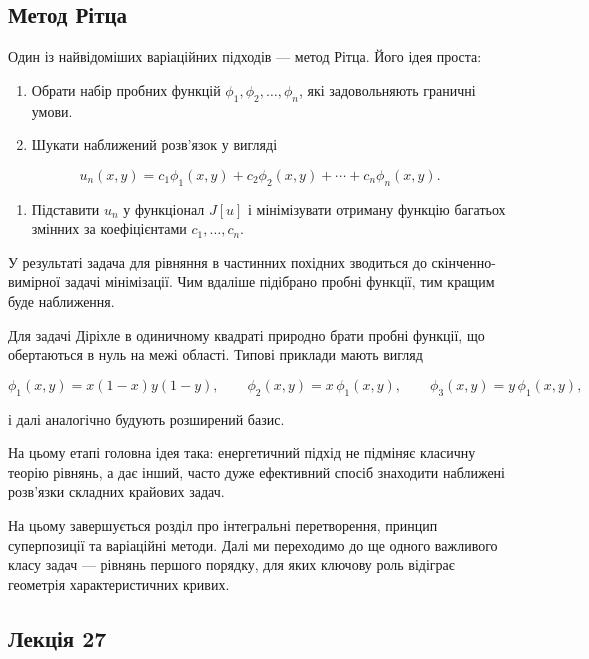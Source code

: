 \documentclass[
  ukrainian,
]{article}
\providecommand{\tightlist}{%
  \setlength{\itemsep}{0pt}\setlength{\parskip}{0pt}}
\begin{document}
\subsection{Метод
Рітца}\label{ux43cux435ux442ux43eux434-ux440ux456ux442ux446ux430}

Один із найвідоміших варіаційних підходів --- метод Рітца. Його ідея
проста:

\begin{enumerate}
\def\labelenumi{\arabic{enumi}.}
\tightlist
\item
  Обрати набір пробних функцій \(\phi_1, \phi_2, \ldots, \phi_n\), які
  задовольняють граничні умови.
\item
  Шукати наближений розв'язок у вигляді
\end{enumerate}

\[
u_n(x,y) = c_1\phi_1(x,y) + c_2\phi_2(x,y) + \cdots + c_n\phi_n(x,y).
\]

\begin{enumerate}
\def\labelenumi{\arabic{enumi}.}
\setcounter{enumi}{2}
\tightlist
\item
  Підставити \(u_n\) у функціонал \(J[u]\) і мінімізувати отриману
  функцію багатьох змінних за коефіцієнтами \(c_1,\ldots,c_n\).
\end{enumerate}

У результаті задача для рівняння в частинних похідних зводиться до
скінченно-вимірної задачі мінімізації. Чим вдаліше підібрано пробні
функції, тим кращим буде наближення.

Для задачі Діріхле в одиничному квадраті природно брати пробні функції,
що обертаються в нуль на межі області. Типові приклади мають вигляд

\[
\phi_1(x,y) = x(1-x)y(1-y), \qquad
\phi_2(x,y) = x\,\phi_1(x,y), \qquad
\phi_3(x,y) = y\,\phi_1(x,y),
\]

і далі аналогічно будують розширений базис.

На цьому етапі головна ідея така: енергетичний підхід не підміняє
класичну теорію рівнянь, а дає інший, часто дуже ефективний спосіб
знаходити наближені розв'язки складних крайових задач.

На цьому завершується розділ про інтегральні перетворення, принцип
суперпозиції та варіаційні методи. Далі ми переходимо до ще одного
важливого класу задач --- рівнянь першого порядку, для яких ключову роль
відіграє геометрія характеристичних кривих.

\subsection{Лекція 27}\label{ux43bux435ux43aux446ux456ux44f-27}
\end{document}
